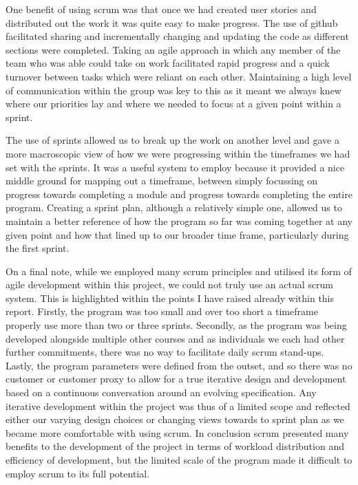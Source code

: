 \documentclass[12pt]{article}
\begin{document}
One benefit of using scrum was that once we had created user stories and distributed out the work it was quite easy to make progress. The use of github facilitated sharing and incrementally changing and updating the code as different sections were completed. Taking an agile approach in which any member of the team who was able could take on work facilitated rapid progress and a quick turnover between tasks which were reliant on each other. Maintaining a high level of communication within the group was key to this as it meant we always knew where our priorities lay and where we needed to focus at a given point within a sprint.

The use of sprints allowed us to break up the work on another level and gave a more macroscopic view of how we were progressing within the timeframes we had set with the sprints. It was a useful system to employ because it provided a nice middle ground for mapping out a timeframe, between simply focussing on progress towards completing a module and progress towards completing the entire program. Creating a sprint plan, although a relatively simple one, allowed us to maintain a better reference of how the program so far was coming together at any given point and how that lined up to our broader time frame, particularly during the first sprint. 

On a final note, while we employed many scrum principles and utilised its form of agile development within this project, we could not truly use an actual scrum system. This is highlighted within the points I have raised already within this report. Firstly, the program was too small and over too short a timeframe properly use more than two or three sprints. Secondly, as the program was being developed alongside multiple other courses and as individuals we each had other further commitments, there was no way to facilitate daily scrum stand-ups. Lastly, the program parameters were defined from the outset, and so there was no customer or customer proxy to allow for a true iterative design and development based on a continuous conversation around an evolving specification. Any iterative development within the project was thus of a limited scope and reflected either our varying design choices or changing views towards to sprint plan as we became more comfortable with using scrum. In conclusion scrum presented many benefits to the development of the project in terms of workload distribution and efficiency of development, but the limited scale of the program made it difficult to employ scrum to its full potential.
\end{document}
